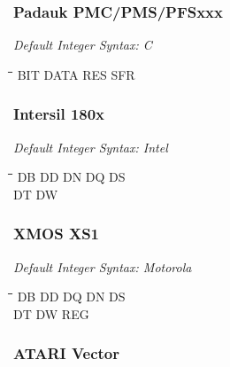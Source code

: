 \subsubsection{Padauk PMC/PMS/PFSxxx}

{\em Default Integer Syntax: C}

{\tt\begin{tabbing}
\hspace{3cm}\=\hspace{3cm}\=\hspace{3cm}\=\hspace{3cm}\=\kill
BIT        \> DATA       \> RES       \> SFR \\
\end{tabbing}}

\subsubsection{Intersil 180x}

{\em Default Integer Syntax: Intel}

{\tt\begin{tabbing}
\hspace{3cm}\=\hspace{3cm}\=\hspace{3cm}\=\hspace{3cm}\=\kill
DB         \> DD          \> DN          \> DQ          \> DS \\
DT         \> DW \\
\end{tabbing}}


\subsubsection{XMOS XS1}

{\em Default Integer Syntax: Motorola}

{\tt\begin{tabbing}
\hspace{3cm}\=\hspace{3cm}\=\hspace{3cm}\=\hspace{3cm}\=\kill
DB         \> DD          \> DQ          \> DN          \> DS \\
DT         \> DW          \> REG \\
\end{tabbing}}

\subsubsection{ATARI Vector}

